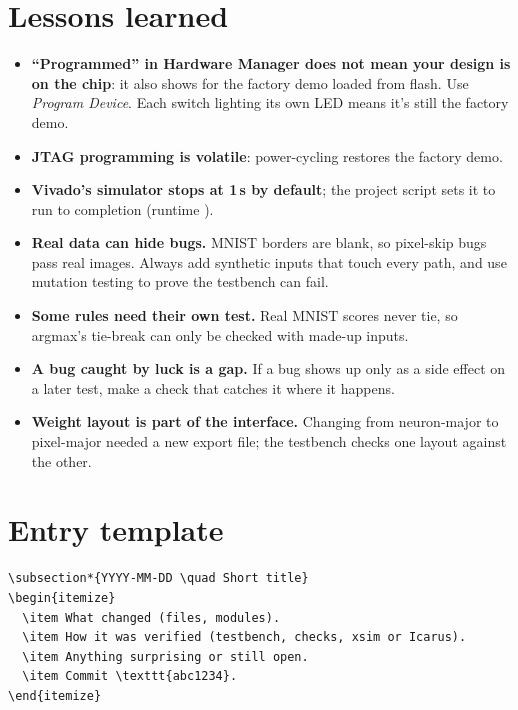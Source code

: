 \documentclass[11pt]{article}
\begin{document}
\section{Lessons learned}
\begin{itemize}
  \item \textbf{``Programmed'' in Hardware Manager does not mean your design is on
        the chip}: it also shows for the factory demo loaded from flash. Use
        \emph{Program Device}. Each switch lighting its own LED means it's still the
        factory demo.
  \item \textbf{JTAG programming is volatile}: power-cycling restores the factory demo.
  \item \textbf{Vivado's simulator stops at 1\,\textmu s by default}; the project script
        sets it to run to completion (runtime ).
  \item \textbf{Real data can hide bugs.} MNIST borders are blank, so pixel-skip
        bugs pass real images. Always add synthetic inputs that touch every path,
        and use mutation testing to prove the testbench can fail.
  \item \textbf{Some rules need their own test.} Real MNIST scores never tie, so
        argmax's tie-break can only be checked with made-up inputs.
  \item \textbf{A bug caught by luck is a gap.} If a bug shows up only as a side
        effect on a later test, make a check that catches it where it happens.
  \item \textbf{Weight layout is part of the interface.} Changing from neuron-major
        to pixel-major needed a new export file; the testbench checks one layout
        against the other.
\end{itemize}

\section{Entry template}\label{sec:template}
\begin{lstlisting}[language={[LaTeX]TeX}]
\subsection*{YYYY-MM-DD \quad Short title}
\begin{itemize}
  \item What changed (files, modules).
  \item How it was verified (testbench, checks, xsim or Icarus).
  \item Anything surprising or still open.
  \item Commit \texttt{abc1234}.
\end{itemize}
\end{lstlisting}
\end{document}
